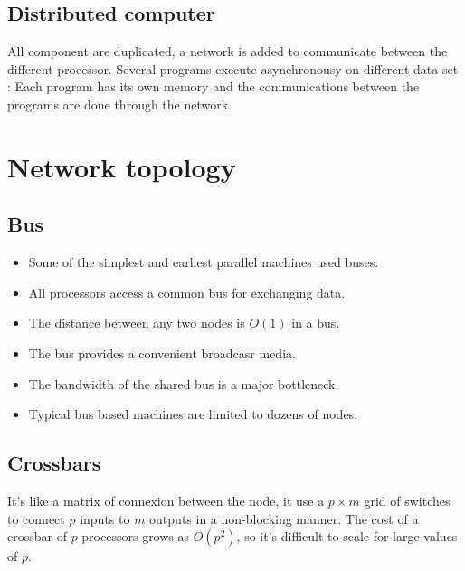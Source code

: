 \documentclass[11pt,a4paper]{report}
\begin{document}

\subsection{Distributed computer} %
\label{sub:Distributed computer}

All component are duplicated, a network is added to communicate between the different processor. Several programs execute asynchronousy on different data set : Each program has its own memory and the communications between the programs are done through the network.



\section{Network topology} %
\label{sec:Network topology}

\subsection{Bus} %
\label{sec:Bus}

\begin{itemize}
    \item Some of the simplest and earliest parallel machines used buses.
    \item All processors access a common bus for exchanging data.
    \item The distance between any two nodes is $O(1)$ in a bus.
    \item The bus provides a convenient broadcasr media.
    \item The bandwidth of the shared bus is a major bottleneck. 
    \item Typical bus based machines are limited to dozens of nodes. 
\end{itemize}


\subsection{Crossbars} %
\label{sec:Crossbars}

It's like a matrix of connexion between the node, it use a $p\times m$  grid of switches to connect $p$ inputs to $m$ outputs in a non-blocking manner. The cost of a crossbar of $p$ processors grows as $O(p^2)$, so it's difficult to scale for large values of $p$.
\end{document}
